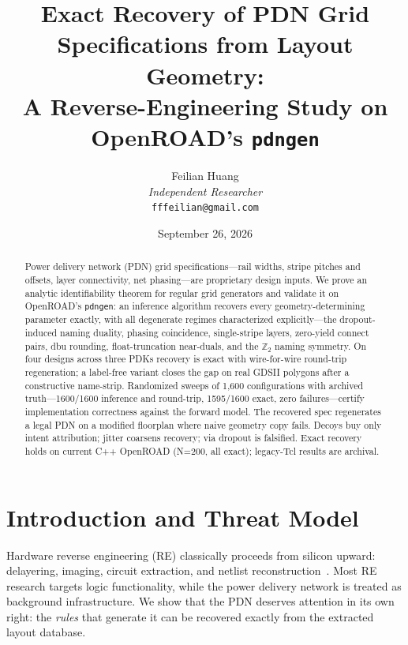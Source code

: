 \documentclass[11pt]{article}
\title{Exact Recovery of PDN Grid Specifications from Layout Geometry:\\
A Reverse-Engineering Study on OpenROAD's \texttt{pdngen}}
\author{Feilian Huang\\ \textit{Independent Researcher}\\ \texttt{fffeilian@gmail.com}}
\date{September 26, 2026}
\begin{document}
\maketitle

\begin{abstract}
Power delivery network (PDN) grid specifications---rail widths, stripe
pitches and offsets, layer connectivity, net phasing---are proprietary
design inputs.  We prove an analytic identifiability theorem for regular
grid generators and validate it on OpenROAD's \texttt{pdngen}: an
inference algorithm recovers every geometry-determining parameter
exactly, with all degenerate regimes characterized explicitly---the
dropout-induced naming duality, phasing coincidence, single-stripe
layers, zero-yield connect pairs, dbu rounding, float-truncation
near-duals, and the $\mathbb{Z}_2$ naming symmetry.  On four designs
across three PDKs recovery is exact with wire-for-wire round-trip
regeneration; a label-free variant closes the gap on real GDSII polygons
after a constructive name-strip.  Randomized sweeps of 1{,}600
configurations with archived truth---1600/1600 inference and round-trip,
1595/1600 exact, zero failures---certify implementation correctness
against the forward model.  The recovered spec regenerates a legal PDN
on a modified floorplan where naive geometry copy fails.  Decoys buy
only intent attribution; jitter coarsens recovery; via dropout is
falsified.  Exact recovery holds on current C++ OpenROAD (N=200, all
exact); legacy-Tcl results are archival.
\end{abstract}

\section{Introduction and Threat Model}

Hardware reverse engineering (RE) classically proceeds from silicon
upward: delayering, imaging, circuit extraction, and netlist
reconstruction~\cite{torrance2009,quadir2016,fyrbiak2017,botero2021}.  Most RE
research targets logic functionality, while the power delivery network is
treated as background infrastructure.  We show that the PDN deserves
attention in its own right: the \emph{rules} that generate it can be
recovered exactly from the extracted layout database.
\end{document}
